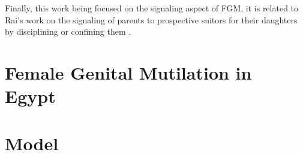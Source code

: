 \documentclass[12pt]{article}
\begin{document}
Finally, this work being focused on the signaling aspect of FGM, it is related to Rai's work on the signaling of parents to prospective suitors for their daughters by disciplining or confining them \cite{Raia}. 

\section{Female Genital Mutilation in Egypt}

\section{Model}



\end{document}
